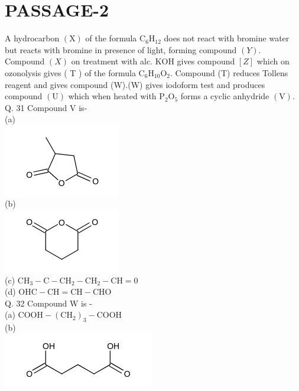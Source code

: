 \documentclass[10pt]{article}
\begin{document}
\section*{PASSAGE-2}
A hydrocarbon $(\mathrm{X})$ of the formula $\mathrm{C}_{6} \mathrm{H}_{12}$ does not react with bromine water but reacts with bromine in presence of light, forming compound $(Y)$. Compound $(X)$ on treatment with alc. KOH gives compound $[Z]$ which on ozonolysis gives ( T ) of the formula $\mathrm{C}_{6} \mathrm{H}_{10} \mathrm{O}_{2}$. Compound (T) reduces Tollens reagent and gives compound (W).(W) gives iodoform test and produces compound $(\mathrm{U})$ which when heated with $\mathrm{P}_{2} \mathrm{O}_{5}$ forms a cyclic anhydride $(\mathrm{V})$.\\
Q. 31 Compound V is-\\
(a)\\
\includegraphics{smile-f302503ad3a2fea6050cabcfdb07651c6240f3f6}\\
(b)\\
\includegraphics{smile-d0d5a9e2a510d03f8e64eba05f33e3d68e2ac874}\\
(c) $\mathrm{CH}_{3}-\mathrm{C}-\mathrm{CH}_{2}-\mathrm{CH}_{2}-\mathrm{CH}=0$\\
(d) $\mathrm{OHC}-\mathrm{CH}=\mathrm{CH}-\mathrm{CHO}$\\
Q. 32 Compound W is -\\
(a) $\mathrm{COOH}-\left(\mathrm{CH}_{2}\right)_{3}-\mathrm{COOH}$\\
(b)\\
\includegraphics{smile-aba0e3e00850dafa678bfd154c33b425d78c3bbf}\\
\end{document}
